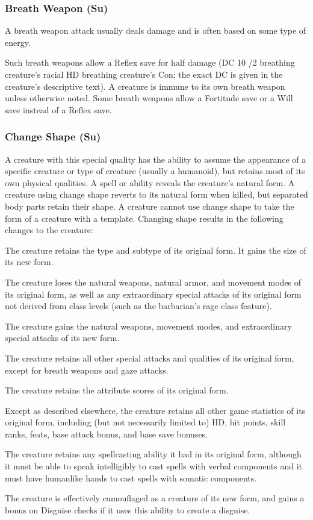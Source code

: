 {\subsubsection{Breath Weapon (Su)} A breath weapon attack usually deals damage and is often based on some type of energy.
\par Such breath weapons allow a Reflex save for half damage (DC 10 /2 breathing creature's racial HD \add breathing creature's Con; the exact DC is given in the creature's descriptive text). A creature is immune to its own breath weapon unless otherwise noted. Some breath weapons allow a Fortitude save or a Will save instead of a Reflex save.

\subsubsection{Change Shape (Su)} A creature with this special quality has the ability to assume the appearance of a specific creature or type of creature (usually a humanoid), but retains most of its own physical qualities. A  spell or ability reveals the creature's natural form. A creature using change shape reverts to its natural form when killed, but separated body parts retain their shape. A creature cannot use change shape to take the form of a creature with a template. Changing shape results in the following changes to the creature:
\begin{itemize*}
\item The creature retains the type and subtype of its original form. It gains the size of its new form.
\item The creature loses the natural weapons, natural armor, and movement modes of its original form, as well as any extraordinary special attacks of its original form not derived from class levels (such as the barbarian's rage class feature).
\item The creature gains the natural weapons, movement modes, and extraordinary special attacks of its new form.
\item The creature retains all other special attacks and qualities of its original form, except for breath weapons and gaze attacks.
\item The creature retains the attribute scores of its original form.
\item Except as described elsewhere, the creature retains all other game statistics of its original form, including (but not necessarily limited to) HD, hit points, skill ranks, feats, base attack bonus, and base save bonuses. 
\item The creature retains any spellcasting ability it had in its original form, although it must be able to speak intelligibly to cast spells with verbal components and it must have humanlike hands to cast spells with somatic components.
\item The creature is effectively camouflaged as a creature of its new form, and gains a   bonus on Disguise checks if it uses this ability to create a disguise.
\end{itemize*}

}
